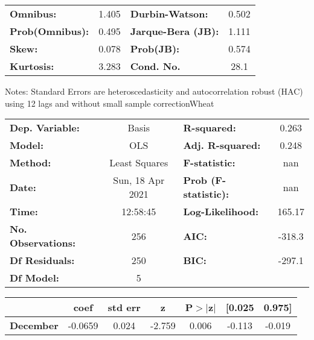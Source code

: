 \begin{center}
\begin{tabular}{lcccccc}
\bottomrule
\end{tabular}
\begin{tabular}{lclc}
\textbf{Omnibus:}       &  1.405 & \textbf{  Durbin-Watson:     } &    0.502  \\
\textbf{Prob(Omnibus):} &  0.495 & \textbf{  Jarque-Bera (JB):  } &    1.111  \\
\textbf{Skew:}          &  0.078 & \textbf{  Prob(JB):          } &    0.574  \\
\textbf{Kurtosis:}      &  3.283 & \textbf{  Cond. No.          } &     28.1  \\
\bottomrule
\end{tabular}
\end{center}

Notes: \newline
 [1] Standard Errors are heteroscedasticity and autocorrelation robust (HAC) using 12 lags and without small sample correctionWheat\begin{center}
\begin{tabular}{lclc}
\toprule
\textbf{Dep. Variable:}    &      Basis       & \textbf{  R-squared:         } &     0.263   \\
\textbf{Model:}            &       OLS        & \textbf{  Adj. R-squared:    } &     0.248   \\
\textbf{Method:}           &  Least Squares   & \textbf{  F-statistic:       } &       nan   \\
\textbf{Date:}             & Sun, 18 Apr 2021 & \textbf{  Prob (F-statistic):} &      nan    \\
\textbf{Time:}             &     12:58:45     & \textbf{  Log-Likelihood:    } &    165.17   \\
\textbf{No. Observations:} &         256      & \textbf{  AIC:               } &    -318.3   \\
\textbf{Df Residuals:}     &         250      & \textbf{  BIC:               } &    -297.1   \\
\textbf{Df Model:}         &           5      & \textbf{                     } &             \\
\bottomrule
\end{tabular}
\begin{tabular}{lcccccc}
                   & \textbf{coef} & \textbf{std err} & \textbf{z} & \textbf{P$> |$z$|$} & \textbf{[0.025} & \textbf{0.975]}  \\
\midrule
\textbf{December}  &      -0.0659  &        0.024     &    -2.759  &         0.006        &       -0.113    &       -0.019     \\

\end{tabular}
\end{center}
